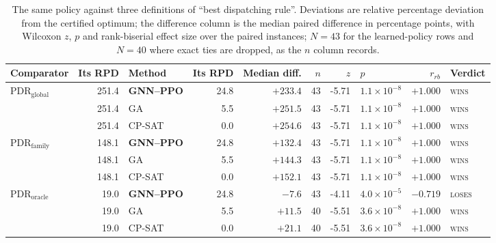 \begin{table}[t]
\caption{The same policy against three definitions of ``best dispatching rule''. Deviations are relative percentage deviation from the certified optimum; the difference column is the median paired difference in percentage points, with Wilcoxon $z$, $p$ and rank-biserial effect size over the paired instances; $N=43$ for the learned-policy rows and $N=40$ where exact ties are dropped, as the $n$ column records.}\label{tbl:comparators}
\begin{tabular*}{\tblwidth}{@{}LrLrrrrlrl@{}}
\toprule
Comparator & Its RPD & Method & Its RPD & Median diff. & $n$ & $z$ & $p$ & $r_{rb}$ & Verdict \\
\midrule
$\mathrm{PDR}_{\mathrm{global}}$ & 251.4 & \textbf{GNN--PPO} & 24.8 & $+233.4$ & 43 & -5.71 & $1.1\times10^{-8}$ & $+1.000$ & \textsc{wins} \\
 & 251.4 & GA & 5.5 & $+251.5$ & 43 & -5.71 & $1.1\times10^{-8}$ & $+1.000$ & \textsc{wins} \\
 & 251.4 & CP-SAT & 0.0 & $+254.6$ & 43 & -5.71 & $1.1\times10^{-8}$ & $+1.000$ & \textsc{wins} \\
$\mathrm{PDR}_{\mathrm{family}}$ & 148.1 & \textbf{GNN--PPO} & 24.8 & $+132.4$ & 43 & -5.71 & $1.1\times10^{-8}$ & $+1.000$ & \textsc{wins} \\
 & 148.1 & GA & 5.5 & $+144.3$ & 43 & -5.71 & $1.1\times10^{-8}$ & $+1.000$ & \textsc{wins} \\
 & 148.1 & CP-SAT & 0.0 & $+152.1$ & 43 & -5.71 & $1.1\times10^{-8}$ & $+1.000$ & \textsc{wins} \\
$\mathrm{PDR}_{\mathrm{oracle}}$ & 19.0 & \textbf{GNN--PPO} & 24.8 & $-7.6$ & 43 & -4.11 & $4.0\times10^{-5}$ & $-0.719$ & \textsc{loses} \\
 & 19.0 & GA & 5.5 & $+11.5$ & 40 & -5.51 & $3.6\times10^{-8}$ & $+1.000$ & \textsc{wins} \\
 & 19.0 & CP-SAT & 0.0 & $+21.1$ & 40 & -5.51 & $3.6\times10^{-8}$ & $+1.000$ & \textsc{wins} \\
\bottomrule
\end{tabular*}
\end{table}
